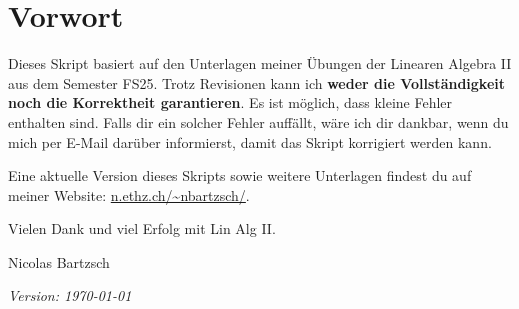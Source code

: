 \section*{Vorwort}
Dieses Skript basiert auf den Unterlagen meiner Übungen der Linearen Algebra II aus dem Semester FS25. Trotz Revisionen kann ich \textbf{weder die Vollständigkeit noch die Korrektheit garantieren}. Es ist möglich, dass kleine Fehler enthalten sind. Falls dir ein solcher Fehler auffällt, wäre ich dir dankbar, wenn du mich per E-Mail darüber informierst, damit das Skript korrigiert werden kann.

\vspace{1\baselineskip}

Eine aktuelle Version dieses Skripts sowie weitere Unterlagen findest du auf meiner Website: \url{n.ethz.ch/~nbartzsch/}.

\vspace{1\baselineskip}

Vielen Dank und viel Erfolg mit Lin Alg II.\

\vspace{1\baselineskip}

Nicolas Bartzsch 

\vspace{1\baselineskip}

\textit{Version: \today}